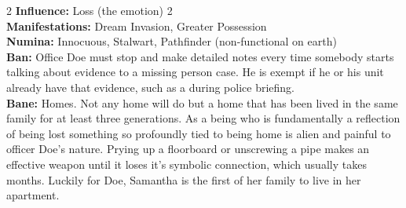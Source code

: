\begin{multicols}{2}
\noindent \textbf{Influence:} Loss (the emotion) 2\\

\noindent \textbf{Manifestations:} Dream Invasion, Greater Possession\\

\noindent \textbf{Numina:} Innocuous, Stalwart, Pathfinder (non-functional on earth)\\

\noindent \textbf{Ban:} Office Doe must stop and make detailed notes every time somebody starts talking about evidence to a missing person case. He is exempt if he or his unit already have that evidence, such as a during police briefing. \\

\noindent \textbf{Bane:} Homes. Not any home will do but a home that has been lived in the same family for at least three generations. As a being who is fundamentally a reflection of being lost something so profoundly tied to being home is alien and painful to officer Doe's nature. Prying up a floorboard or unscrewing a pipe makes an effective weapon until it loses it's symbolic connection, which usually takes months. Luckily for Doe, Samantha is the first of her family to live in her apartment. 


\end{multicols}\newpage{}
